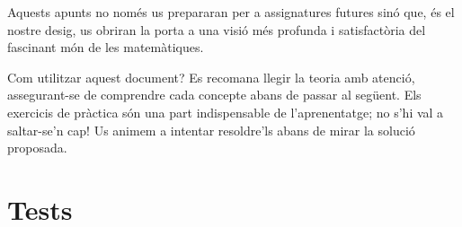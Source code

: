 \documentclass[12pt,a4paper,oneside]{book}
\theoremstyle{plain}
\theoremstyle{definition}
\theoremstyle{remark}
\numberwithin{equation}{section}
\begin{document}
Aquests apunts no nom\'{e}s us prepararan per a assignatures futures sin\'{o}
que, \'{e}s el nostre desig, us obriran la porta a una visi\'{o} m\'{e}s
profunda i satisfact\`{o}ria del fascinant m\'{o}n de les matem\`{a}tiques.

Com utilitzar aquest document? Es recomana llegir la teoria amb atenci\'{o},
assegurant-se de comprendre cada concepte abans de passar al seg\"{u}ent.
Els exercicis de pr\`{a}ctica s\'{o}n una part indispensable de
l'aprenentatge; no s'hi val a saltar-se'n cap! Us animem a intentar
resoldre'ls abans de mirar la soluci\'{o} proposada.

\let\cleardoublepage\clearpage

\mainmatter

 
%


\chapter{Tests}

\label{cap:tests}

\begin{Form}

%

\end{Form}

\backmatter
\end{document}
